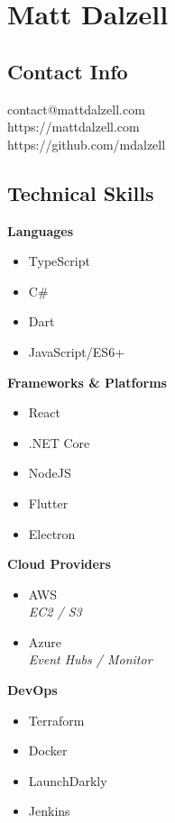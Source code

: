 \documentclass[11pt]{article}
\begin{document}

\section*{Matt Dalzell}

\setlength{\columnsep}{4em}
\setlength{\columnseprule}{0.1pt}
\begin{paracol}{2}

\subsection*{Contact Info}
contact@mattdalzell.com \\ 
https://mattdalzell.com \\
https://github.com/mdalzell 

\subsection*{Technical Skills} 

\textbf{Languages}
\begin{itemize}
    \item TypeScript
    \item C\#
    \item Dart
    \item JavaScript/ES6+
\end{itemize}

\noindent \textbf{Frameworks \& Platforms}
\begin{itemize}
    \item React
    \item .NET Core
    \item NodeJS
    \item Flutter
    \item Electron
\end{itemize}

\noindent \textbf{Cloud Providers}
\begin{itemize}
    \item AWS  \\ {\footnotesize{\textit{EC2 / S3}}}
    \item Azure \\ {\footnotesize{\textit{Event Hubs / Monitor}}}
\end{itemize}

\noindent \textbf{DevOps}
\begin{itemize}
    \item Terraform
    \item Docker
    \item LaunchDarkly
    \item Jenkins
\end{itemize}


\end{paracol}
\end{document}
